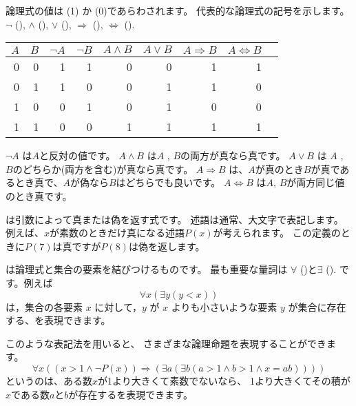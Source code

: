
論理式の値は
 (1) か  (0)であらわされます。
代表的な論理式の記号を示します。
$\lnot$ (),
$\land$ (),
$\lor$ (),
$\Rightarrow$ (),
$\Leftrightarrow$ ().

\begin{center}
\begin{tabular}{rr|rrrrrrr}
$A$ & $B$ & $\lnot A$ & $\lnot B$ & $A \land B$ & $A \lor B$ & $A \Rightarrow B$ & $A \Leftrightarrow B$ \\
\hline
0 & 0 & 1 & 1 & 0 & 0 & 1 & 1 \\
0 & 1 & 1 & 0 & 0 & 1 & 1 & 0 \\
1 & 0 & 0 & 1 & 0 & 1 & 0 & 0 \\
1 & 1 & 0 & 0 & 1 & 1 & 1 & 1 \\
\end{tabular}
\end{center}

$\lnot A$ は$A$と反対の値です。
$A \land B$ は$A$ ,  $B$の両方が真なら真です。
$A \lor B$ は $A$ ,  $B$のどちらか(両方を含む)が真なら真です。
$A \Rightarrow B$ は、$A$が真のとき$B$が真であるとき真で、$A$が偽なら$B$はどちらでも良いです。
$A \Leftrightarrow B$ は$A$, $B$が両方同じ値のとき真です。


は引数によって真または偽を返す式です。
述語は通常、大文字で表記します。
例えば、$x$が素数のときだけ真になる述語$P(x)$が考えられます。
この定義のときに$P(7)$は真ですが$P(8)$は偽を返します。


は論理式と集合の要素を結びつけるものです。
最も重要な量詞は
$\forall$ ()と$\exists$ ().
です。例えば
\[\forall x (\exists y (y < x))\]
は，集合の各要素 $x$ に対して，$y$ が $x$ よりも小さいような要素 $y$ が集合に存在する、を表現できます。

このような表記法を用いると、
さまざまな論理命題を表現することができます。
\[\forall x ((x>1 \land \lnot P(x)) \Rightarrow (\exists a (\exists b (a > 1 \land b > 1 \land x = ab))))\]
というのは、ある数$x$が1より大きくて素数でないなら、
1より大きくてその積が$x$である数$a$と$b$が存在するを表現できます。

